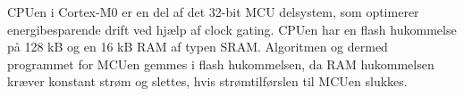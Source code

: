 CPUen i Cortex-M0 er en del af det 32-bit MCU delsystem, som optimerer energibesparende drift ved hjælp af clock gating. %
CPUen har en flash hukommelse på 128 kB og en 16 kB RAM af typen SRAM. Algoritmen og dermed programmet for MCUen gemmes i flash hukommelsen, da RAM hukommelsen kræver konstant strøm og slettes, hvis strømtilførslen til MCUen slukkes. \citep{Semiconductor20164200M}
%
